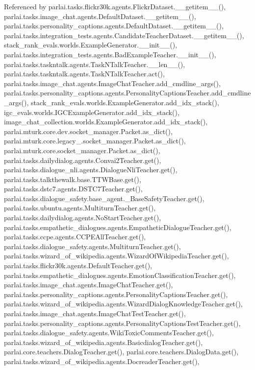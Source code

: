 Referenced by parlai.\+tasks.\+flickr30k.\+agents.\+Flickr\+Dataset.\+\_\+\+\_\+getitem\+\_\+\+\_\+(), parlai.\+tasks.\+image\+\_\+chat.\+agents.\+Default\+Dataset.\+\_\+\+\_\+getitem\+\_\+\+\_\+(), parlai.\+tasks.\+personality\+\_\+captions.\+agents.\+Default\+Dataset.\+\_\+\+\_\+getitem\+\_\+\+\_\+(), parlai.\+tasks.\+integration\+\_\+tests.\+agents.\+Candidate\+Teacher\+Dataset.\+\_\+\+\_\+getitem\+\_\+\+\_\+(), stack\+\_\+rank\+\_\+evals.\+worlds.\+Example\+Generator.\+\_\+\+\_\+init\+\_\+\+\_\+(), parlai.\+tasks.\+integration\+\_\+tests.\+agents.\+Bad\+Example\+Teacher.\+\_\+\+\_\+init\+\_\+\+\_\+(), parlai.\+tasks.\+taskntalk.\+agents.\+Task\+N\+Talk\+Teacher.\+\_\+\+\_\+len\+\_\+\+\_\+(), parlai.\+tasks.\+taskntalk.\+agents.\+Task\+N\+Talk\+Teacher.\+act(), parlai.\+tasks.\+image\+\_\+chat.\+agents.\+Image\+Chat\+Teacher.\+add\+\_\+cmdline\+\_\+args(), parlai.\+tasks.\+personality\+\_\+captions.\+agents.\+Personality\+Captions\+Teacher.\+add\+\_\+cmdline\+\_\+args(), stack\+\_\+rank\+\_\+evals.\+worlds.\+Example\+Generator.\+add\+\_\+idx\+\_\+stack(), igc\+\_\+evals.\+worlds.\+I\+G\+C\+Example\+Generator.\+add\+\_\+idx\+\_\+stack(), image\+\_\+chat\+\_\+collection.\+worlds.\+Example\+Generator.\+add\+\_\+idx\+\_\+stack(), parlai.\+mturk.\+core.\+dev.\+socket\+\_\+manager.\+Packet.\+as\+\_\+dict(), parlai.\+mturk.\+core.\+legacy\+\_.\+socket\+\_\+manager.\+Packet.\+as\+\_\+dict(), parlai.\+mturk.\+core.\+socket\+\_\+manager.\+Packet.\+as\+\_\+dict(), parlai.\+tasks.\+dailydialog.\+agents.\+Convai2\+Teacher.\+get(), parlai.\+tasks.\+dialogue\+\_\+nli.\+agents.\+Dialogue\+Nli\+Teacher.\+get(), parlai.\+tasks.\+talkthewalk.\+base.\+T\+T\+W\+Base.\+get(), parlai.\+tasks.\+dstc7.\+agents.\+D\+S\+T\+C7\+Teacher.\+get(), parlai.\+tasks.\+dialogue\+\_\+safety.\+base\+\_\+agent.\+\_\+\+Base\+Safety\+Teacher.\+get(), parlai.\+tasks.\+ubuntu.\+agents.\+Multiturn\+Teacher.\+get(), parlai.\+tasks.\+dailydialog.\+agents.\+No\+Start\+Teacher.\+get(), parlai.\+tasks.\+empathetic\+\_\+dialogues.\+agents.\+Empathetic\+Dialogue\+Teacher.\+get(), parlai.\+tasks.\+ccpe.\+agents.\+C\+C\+P\+E\+All\+Teacher.\+get(), parlai.\+tasks.\+dialogue\+\_\+safety.\+agents.\+Multiturn\+Teacher.\+get(), parlai.\+tasks.\+wizard\+\_\+of\+\_\+wikipedia.\+agents.\+Wizard\+Of\+Wikipedia\+Teacher.\+get(), parlai.\+tasks.\+flickr30k.\+agents.\+Default\+Teacher.\+get(), parlai.\+tasks.\+empathetic\+\_\+dialogues.\+agents.\+Emotion\+Classification\+Teacher.\+get(), parlai.\+tasks.\+image\+\_\+chat.\+agents.\+Image\+Chat\+Teacher.\+get(), parlai.\+tasks.\+personality\+\_\+captions.\+agents.\+Personality\+Captions\+Teacher.\+get(), parlai.\+tasks.\+wizard\+\_\+of\+\_\+wikipedia.\+agents.\+Wizard\+Dialog\+Knowledge\+Teacher.\+get(), parlai.\+tasks.\+image\+\_\+chat.\+agents.\+Image\+Chat\+Test\+Teacher.\+get(), parlai.\+tasks.\+personality\+\_\+captions.\+agents.\+Personality\+Captions\+Test\+Teacher.\+get(), parlai.\+tasks.\+dialogue\+\_\+safety.\+agents.\+Wiki\+Toxic\+Comments\+Teacher.\+get(), parlai.\+tasks.\+wizard\+\_\+of\+\_\+wikipedia.\+agents.\+Basicdialog\+Teacher.\+get(), parlai.\+core.\+teachers.\+Dialog\+Teacher.\+get(), parlai.\+core.\+teachers.\+Dialog\+Data.\+get(), parlai.\+tasks.\+wizard\+\_\+of\+\_\+wikipedia.\+agents.\+Docreader\+Teacher.\+get(), 